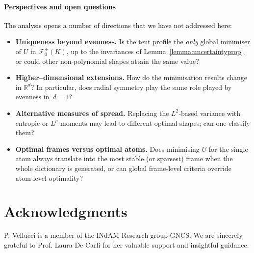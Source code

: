 \documentclass[preprint,hidelinks,authoryear]{elsarticle}
\theoremstyle{plain}
\theoremstyle{definition}
\theoremstyle{remark}
\begin{document}
\textcolor{black}{\paragraph{Perspectives and open questions}
The analysis opens a number of directions that we have not addressed here:}
\begin{itemize}
  \item \textbf{Uniqueness beyond evenness.}
        Is the tent profile the \emph{only} global minimiser of $U$ in
        $\mathcal{F}^+_{0}(K)$, up to the invariances of
        Lemma~\ref{lemma:uncertaintyprop}, or could other non‑polynomial
        shapes attain the same value?
  \item \textbf{Higher–dimensional extensions.}
        How do the minimisation results change in $\mathbb R^d$?
        In particular, does radial symmetry play the same role played by
        evenness in~$d=1$?
  \item \textbf{Alternative measures of spread.}
        Replacing the $L^2$‑based variance with entropic or $L^p$
        moments may lead to different optimal shapes; can one classify them?
  \item \textbf{Optimal frames versus optimal atoms.}
        Does minimising $U$ for the single atom always translate into the
        most stable (or sparsest) frame when the whole dictionary is
        generated, or can global frame‐level criteria override atom‐level
        optimality?
\end{itemize}











\section*{Acknowledgments}
P. Vellucci is a member of the INdAM Research group GNCS. We are sincerely grateful to Prof. Laura De Carli for her valuable support and insightful guidance.












 







\end{document}
